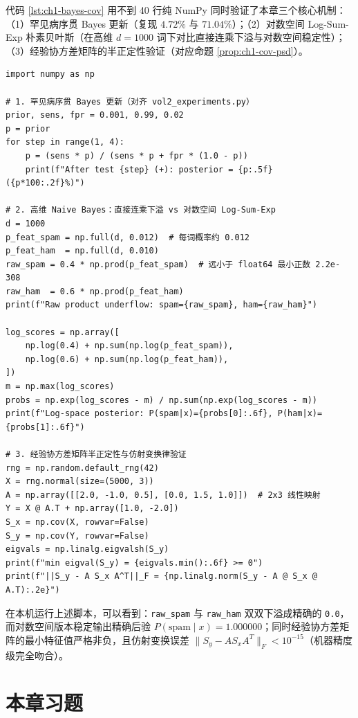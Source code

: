 代码 \ref{lst:ch1-bayes-cov} 用不到 40 行纯 NumPy 同时验证了本章三个核心机制：（1）罕见病序贯 Bayes 更新（复现 $4.72\%$ 与 $71.04\%$）；（2）对数空间 Log-Sum-Exp 朴素贝叶斯（在高维 $d=1000$ 词下对比直接连乘下溢与对数空间稳定性）；（3）经验协方差矩阵的半正定性验证（对应命题 \ref{prop:ch1-cov-psd}）。

\begin{lstlisting}[caption={序贯 Bayes 更新、对数空间防下溢与经验协方差矩阵半正定性验证}, label={lst:ch1-bayes-cov}]
import numpy as np

# 1. 罕见病序贯 Bayes 更新（对齐 vol2_experiments.py）
prior, sens, fpr = 0.001, 0.99, 0.02
p = prior
for step in range(1, 4):
    p = (sens * p) / (sens * p + fpr * (1.0 - p))
    print(f"After test {step} (+): posterior = {p:.5f} ({p*100:.2f}%)")

# 2. 高维 Naive Bayes：直接连乘下溢 vs 对数空间 Log-Sum-Exp
d = 1000
p_feat_spam = np.full(d, 0.012)  # 每词概率约 0.012
p_feat_ham  = np.full(d, 0.010)
raw_spam = 0.4 * np.prod(p_feat_spam)  # 远小于 float64 最小正数 2.2e-308
raw_ham  = 0.6 * np.prod(p_feat_ham)
print(f"Raw product underflow: spam={raw_spam}, ham={raw_ham}")

log_scores = np.array([
    np.log(0.4) + np.sum(np.log(p_feat_spam)),
    np.log(0.6) + np.sum(np.log(p_feat_ham)),
])
m = np.max(log_scores)
probs = np.exp(log_scores - m) / np.sum(np.exp(log_scores - m))
print(f"Log-space posterior: P(spam|x)={probs[0]:.6f}, P(ham|x)={probs[1]:.6f}")

# 3. 经验协方差矩阵半正定性与仿射变换律验证
rng = np.random.default_rng(42)
X = rng.normal(size=(5000, 3))
A = np.array([[2.0, -1.0, 0.5], [0.0, 1.5, 1.0]])  # 2x3 线性映射
Y = X @ A.T + np.array([1.0, -2.0])
S_x = np.cov(X, rowvar=False)
S_y = np.cov(Y, rowvar=False)
eigvals = np.linalg.eigvalsh(S_y)
print(f"min eigval(S_y) = {eigvals.min():.6f} >= 0")
print(f"||S_y - A S_x A^T||_F = {np.linalg.norm(S_y - A @ S_x @ A.T):.2e}")
\end{lstlisting}

在本机运行上述脚本，可以看到：\texttt{raw\_spam} 与 \texttt{raw\_ham} 双双下溢成精确的 \texttt{0.0}，而对数空间版本稳定输出精确后验 $P(\text{spam}\mid x) = 1.000000$；同时经验协方差矩阵的最小特征值严格非负，且仿射变换误差 $\|S_y - A S_x A^T\|_F < 10^{-15}$（机器精度级完全吻合）。

\section{本章习题}
\label{sec:ch1-exercises}

